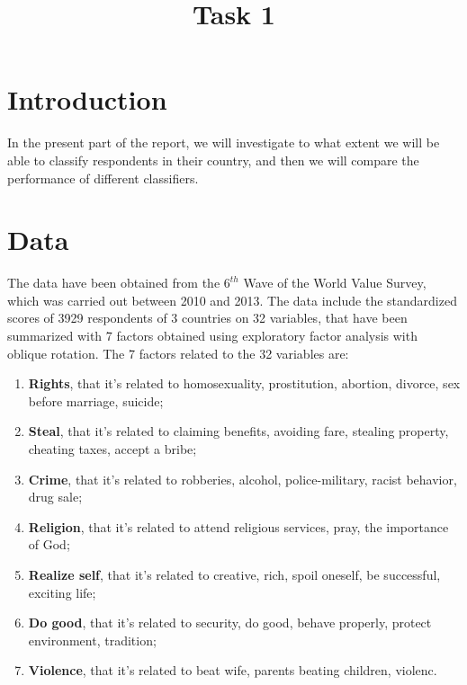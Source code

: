 \documentclass[
  11pt,
]{article}
\title{Task 1}
\author{}
\date{\vspace{-2.5em}}
\providecommand{\tightlist}{%
  \setlength{\itemsep}{0pt}\setlength{\parskip}{0pt}}
\begin{document}
\maketitle

{
\setcounter{tocdepth}{2}
\tableofcontents
}
\hypertarget{introduction}{%
\section{Introduction}\label{introduction}}

In the present part of the report, we will investigate to what extent we will be able to classify respondents in their country, and then we will compare the performance of different classifiers.

\hypertarget{data}{%
\section{Data}\label{data}}

The data have been obtained from the \(6^{th}\) Wave of the World Value Survey, which was carried out between 2010 and 2013. The data include the standardized scores of 3929 respondents of 3 countries on 32 variables, that have been summarized with 7 factors obtained using exploratory factor analysis with oblique rotation.
The 7 factors related to the 32 variables are:

\begin{enumerate}
\def\labelenumi{\arabic{enumi}.}
\tightlist
\item
  \textbf{Rights}, that it's related to homosexuality, prostitution, abortion, divorce, sex before marriage, suicide;
\item
  \textbf{Steal}, that it's related to claiming benefits, avoiding fare, stealing property, cheating taxes, accept a bribe;
\item
  \textbf{Crime}, that it's related to robberies, alcohol, police-military, racist behavior, drug sale;
\item
  \textbf{Religion}, that it's related to attend religious services, pray, the importance of God;
\item
  \textbf{Realize self}, that it's related to creative, rich, spoil oneself, be successful, exciting life;
\item
  \textbf{Do good}, that it's related to security, do good, behave properly, protect environment, tradition;
\item
  \textbf{Violence}, that it's related to beat wife, parents beating children, violenc.
\end{enumerate}
\end{document}
